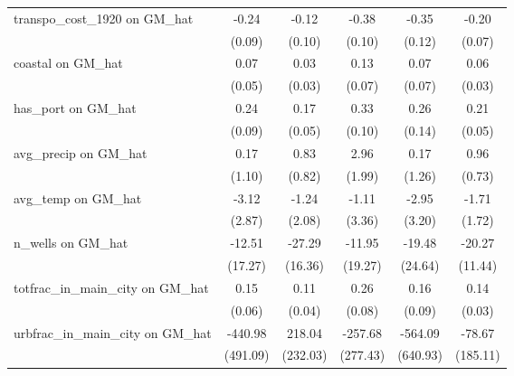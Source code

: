 {\begin{tabular}{l*{5}{c}}
\addlinespace
transpo\_cost\_1920 on GM\_hat&    -0.24\sym{*}  &    -0.12         &    -0.38\sym{***}&    -0.35\sym{**} &    -0.20\sym{**} \\
                &   (0.09)         &   (0.10)         &   (0.10)         &   (0.12)         &   (0.07)         \\
\addlinespace
coastal on GM\_hat&     0.07         &     0.03         &     0.13         &     0.07         &     0.06\sym{*}  \\
                &   (0.05)         &   (0.03)         &   (0.07)         &   (0.07)         &   (0.03)         \\
\addlinespace
has\_port on GM\_hat&     0.24\sym{**} &     0.17\sym{***}&     0.33\sym{***}&     0.26         &     0.21\sym{***}\\
                &   (0.09)         &   (0.05)         &   (0.10)         &   (0.14)         &   (0.05)         \\
\addlinespace
avg\_precip on GM\_hat&     0.17         &     0.83         &     2.96         &     0.17         &     0.96         \\
                &   (1.10)         &   (0.82)         &   (1.99)         &   (1.26)         &   (0.73)         \\
\addlinespace
avg\_temp on GM\_hat&    -3.12         &    -1.24         &    -1.11         &    -2.95         &    -1.71         \\
                &   (2.87)         &   (2.08)         &   (3.36)         &   (3.20)         &   (1.72)         \\
\addlinespace
n\_wells on GM\_hat&   -12.51         &   -27.29         &   -11.95         &   -19.48         &   -20.27         \\
                &  (17.27)         &  (16.36)         &  (19.27)         &  (24.64)         &  (11.44)         \\
\addlinespace
totfrac\_in\_main\_city on GM\_hat&     0.15\sym{*}  &     0.11\sym{**} &     0.26\sym{**} &     0.16         &     0.14\sym{***}\\
                &   (0.06)         &   (0.04)         &   (0.08)         &   (0.09)         &   (0.03)         \\
\addlinespace
urbfrac\_in\_main\_city on GM\_hat&  -440.98         &   218.04         &  -257.68         &  -564.09         &   -78.67         \\
                & (491.09)         & (232.03)         & (277.43)         & (640.93)         & (185.11)         \\

\end{tabular}}
